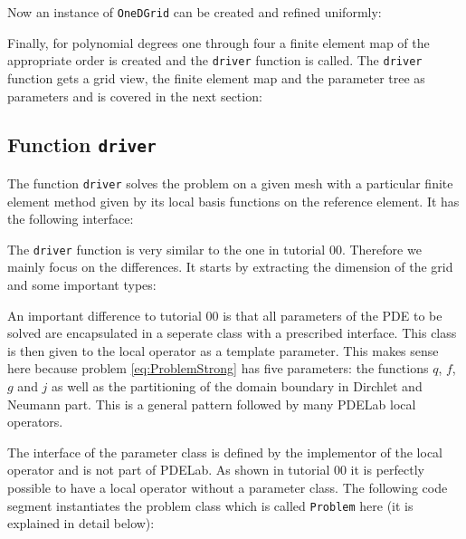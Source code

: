 \documentclass[a4paper,12pt]{article}
\begin{document}
Now an instance of \lstinline{OneDGrid} can be created and
refined uniformly:


Finally, for polynomial degrees one through four a finite element
map of the appropriate order is created and the \lstinline{driver} function
is called. The \lstinline{driver} function gets a grid view, the finite element map
and the parameter tree as parameters and is covered in the next section:


\subsection{Function \lstinline{driver}}

The function \lstinline{driver} solves the problem on a given mesh
with a particular finite element method given by its local basis functions
on the reference element. It has the following interface:


The \lstinline{driver} function is very similar to the one in
tutorial 00. Therefore we mainly focus on the differences.
It starts by extracting the dimension of the grid and some
important types:


An important difference to tutorial 00 is that all parameters
of the PDE to be solved are encapsulated in a seperate class with
a prescribed interface. This class is then given to the local operator
as a template parameter. This makes sense here because problem \eqref{eq:ProblemStrong}
has five parameters: the functions $q$, $f$, $g$ and $j$ as well as
the partitioning of the domain boundary in Dirchlet and Neumann
part. This is a general pattern followed by many PDELab local operators.

The interface of the parameter class is defined by the implementor of the
local operator and is not part of PDELab. As shown in tutorial 00 it is
perfectly possible to have a local operator without a parameter class.
The following code segment instantiates the problem class which
is called \lstinline{Problem} here (it is explained in detail below):

\end{document}
